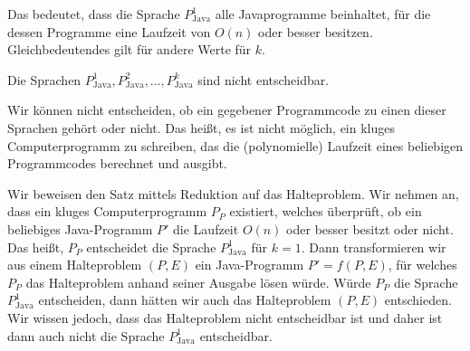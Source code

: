 \documentclass[journal]{IEEEtran}
\begin{document}
Das bedeutet, dass die Sprache $P_\text{Java}^1$ alle Javaprogramme beinhaltet, für die dessen Programme eine Laufzeit von $O(n)$ oder besser besitzen. Gleichbedeutendes gilt für andere Werte für $k$.

\begin{theorem}
  Die Sprachen $P_\text{Java}^1, P_\text{Java}^2, \dotsc, P_\text{Java}^k$ sind nicht entscheidbar.
\end{theorem}

Wir können nicht entscheiden, ob ein gegebener Programmcode zu einen dieser Sprachen gehört oder nicht. Das heißt, es ist nicht möglich, ein kluges Computerprogramm zu schreiben, das die (polynomielle) Laufzeit eines beliebigen Programmcodes berechnet und ausgibt.

Wir beweisen den Satz mittels Reduktion auf das Halteproblem. Wir nehmen an, dass ein kluges Computerprogramm $P_P$ existiert, welches überprüft, ob ein beliebiges Java-Programm $P'$ die Laufzeit $O(n)$ oder besser besitzt oder nicht. Das heißt, $P_P$ entscheidet die Sprache $P_\text{Java}^1$ für $k = 1$. Dann transformieren wir aus einem Halteproblem $(P, E)$ ein Java-Programm $P' = f(P, E)$, für welches $P_P$ das Halteproblem anhand seiner Ausgabe lösen würde. Würde $P_P$ die Sprache $P_\text{Java}^1$ entscheiden, dann hätten wir auch das Halteproblem $(P, E)$ entschieden. Wir wissen jedoch, dass das Halteproblem nicht entscheidbar ist und daher ist dann auch nicht die Sprache $P_\text{Java}^1$ entscheidbar.
\end{document}
